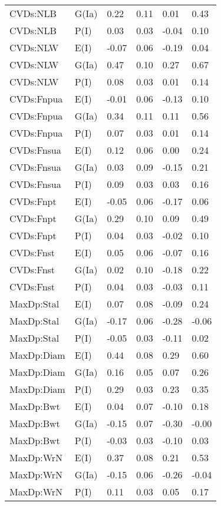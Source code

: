 \begin{center}
\begin{longtable}{|p{1.1in}|p{0.7in}|p{0.7in}|p{0.6in}|p{0.6in}|p{0.6in}|}
  CVDs:NLB & G(Ia) & 0.22 & 0.11 & 0.01 & 0.43 \\ 
  CVDs:NLB & P(I) & 0.03 & 0.03 & -0.04 & 0.10 \\ 
  CVDs:NLW & E(I) & -0.07 & 0.06 & -0.19 & 0.04 \\ 
  CVDs:NLW & G(Ia) & 0.47 & 0.10 & 0.27 & 0.67 \\ 
  CVDs:NLW & P(I) & 0.08 & 0.03 & 0.01 & 0.14 \\ 
  CVDs:Fnpua & E(I) & -0.01 & 0.06 & -0.13 & 0.10 \\ 
  CVDs:Fnpua & G(Ia) & 0.34 & 0.11 & 0.11 & 0.56 \\ 
  CVDs:Fnpua & P(I) & 0.07 & 0.03 & 0.01 & 0.14 \\ 
  CVDs:Fnsua & E(I) & 0.12 & 0.06 & 0.00 & 0.24 \\ 
  CVDs:Fnsua & G(Ia) & 0.03 & 0.09 & -0.15 & 0.21 \\ 
  CVDs:Fnsua & P(I) & 0.09 & 0.03 & 0.03 & 0.16 \\ 
  CVDs:Fnpt & E(I) & -0.05 & 0.06 & -0.17 & 0.06 \\ 
  CVDs:Fnpt & G(Ia) & 0.29 & 0.10 & 0.09 & 0.49 \\ 
  CVDs:Fnpt & P(I) & 0.04 & 0.03 & -0.02 & 0.10 \\ 
  CVDs:Fnst & E(I) & 0.05 & 0.06 & -0.07 & 0.16 \\ 
  CVDs:Fnst & G(Ia) & 0.02 & 0.10 & -0.18 & 0.22 \\ 
  CVDs:Fnst & P(I) & 0.04 & 0.03 & -0.03 & 0.11 \\ 
  MaxDp:Stal & E(I) & 0.07 & 0.08 & -0.09 & 0.24 \\ 
  MaxDp:Stal & G(Ia) & -0.17 & 0.06 & -0.28 & -0.06 \\ 
  MaxDp:Stal & P(I) & -0.05 & 0.03 & -0.11 & 0.02 \\ 
  MaxDp:Diam & E(I) & 0.44 & 0.08 & 0.29 & 0.60 \\ 
  MaxDp:Diam & G(Ia) & 0.16 & 0.05 & 0.07 & 0.26 \\ 
  MaxDp:Diam & P(I) & 0.29 & 0.03 & 0.23 & 0.35 \\ 
  MaxDp:Bwt & E(I) & 0.04 & 0.07 & -0.10 & 0.18 \\ 
  MaxDp:Bwt & G(Ia) & -0.15 & 0.07 & -0.30 & -0.00 \\ 
  MaxDp:Bwt & P(I) & -0.03 & 0.03 & -0.10 & 0.03 \\ 
  MaxDp:WrN & E(I) & 0.37 & 0.08 & 0.21 & 0.53 \\ 
  MaxDp:WrN & G(Ia) & -0.15 & 0.06 & -0.26 & -0.04 \\ 
  MaxDp:WrN & P(I) & 0.11 & 0.03 & 0.05 & 0.17 \\ 

\end{longtable}
\end{center}
